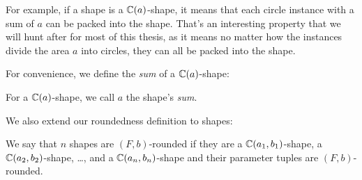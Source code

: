 \documentclass[%
    a4paper,              %
    style=screen,          %
    bibliography=totoc,   %
    nexus,                %
    lnum,                 %
    extramargin,          %
]{tubsbook}
\begin{document}
For example, if a shape is a $\mathbb{C}(a)$-shape, it means that each circle instance with a sum of $a$ can be packed into the shape. That's an interesting property that we will hunt after for most of this thesis, as it means no matter how the instances divide the area $a$ into circles, they can all be packed into the shape.

For convenience, we define the \emph{sum} of a $\mathbb{C}(a)$-shape:

\begin{definition}
    For a $\mathbb{C}(a)$-shape, we call $a$ the shape's \emph{sum}.
\end{definition}

We also extend our roundedness definition to shapes:

\begin{definition}
    We say that $n$ shapes are $(F,b)$-rounded if they are a $\mathbb{C}(a_1, b_1)$-shape, a $\mathbb{C}(a_2, b_2)$-shape, \dots, and a $\mathbb{C}(a_n, b_n)$-shape and their parameter tuples are $(F,b)$-rounded.
\end{definition}




\end{document}
